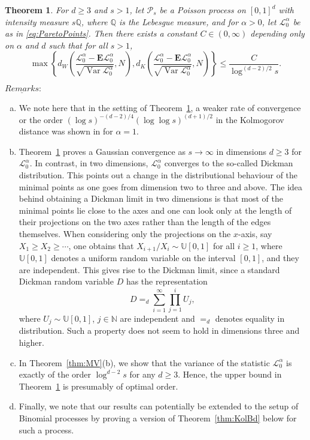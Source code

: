 \documentclass[11pt,reqno]{amsart}
\numberwithin{equation}{section}
\newtheorem{theorem}{Theorem}[section]
\theoremstyle{definition}
\newcommand{\E}{\mathbf{E}}
\newcommand{\sP}{\mathcal{P}}
\newcommand{\N}{\mathbb{N}}
\newcommand{\QQ}{\mathbb{Q}}
\DeclareMathOperator{\Var}{Var}
\begin{document}
\begin{theorem}\label{thm:Pareto}
	For $d \ge 3$ and $s >1$, let $\sP_s$ be a Poisson process on $[0,1]^d$ with intensity measure
	$s\QQ$, where $\QQ$ is the Lebesgue measure, and for $\alpha>0$, let $\mathscr{L}_0^{\alpha}$ be as in \eqref{eq:ParetoPoints}. Then there exists a constant $C \in (0,\infty)$ depending only on $\alpha$ and $d$ such that for all $ s>1$,
	\begin{displaymath}
	\max \left\{d_W\left(\frac{\mathscr{L}_0^{\alpha} - \E \mathscr{L}_0^{\alpha}}{\sqrt{\Var
			\mathscr{L}_0^{\alpha}}},N\right),
	d_K\left(\frac{\mathscr{L}_0^{\alpha} - \E \mathscr{L}_0^{\alpha}}{\sqrt{\Var \mathscr{L}_0^{\alpha}}},N\right)\right\} \le
	\frac{C}{\log^{(d-2)/2} s}.
	\end{displaymath}
\end{theorem}

\vspace{.1cm}

\noindent$\underline{Remarks}:$ \begin{enumerate}[(a)]
	\item We note here that in the setting of Theorem~\ref{thm:Pareto}, a weaker rate of convergence or the order $(\log s)^{-(d-2)/4} (\log \log s)^{(d+1)/2}$ in the Kolmogorov distance was shown in \cite{BLP06} for $\alpha=1$.
	\item Theorem~\ref{thm:Pareto} proves a Gaussian convergence as $s \to \infty$ in dimensions $d \ge 3$ for $\mathscr{L}_0^{\alpha}$. In contrast, in two dimensions, $\mathscr{L}_0^{\alpha}$ converges to the so-called Dickman distribution. This points out a change in the distributional behaviour of the minimal points as one goes from dimension two to three and above. The idea behind obtaining a Dickman limit in two dimensions is that most of the minimal points lie close to the axes and one can look only at the length of their projections on the two axes rather than the length of the edges themselves. When considering only the projections on the $x$-axis, say $X_1 \ge X_2 \ge \cdots$, one obtains that $X_{i+1}/X_i \sim \mathbb{U}[0,1]$ for all $i \ge 1$, where $\mathbb{U}[0,1]$ denotes a uniform random variable on the interval $[0,1]$, and they are independent. This gives rise to the Dickman limit, since a standard Dickman random variable $D$ has the representation
		$$
		D =_d \sum_{i=1}^\infty \prod_{j=1}^{i} U_j,
		$$
		where $U_j \sim \mathbb{U}[0,1]$, $j \in \N$ are independent and $=_d$ denotes equality in distribution. Such a property does not seem to hold in dimensions three and higher.
	\item  In Theorem~\ref{thm:MV}(b), we show that the variance of the statistic $\mathscr{L}_0^{\alpha}$ is exactly of the order $\log^{d-2} s$ for any $d \ge 3$. Hence, the upper bound in Theorem~\ref{thm:Pareto} is presumably of optimal order. 
	\item  Finally, we note that our results can potentially be extended to the setup of Binomial processes by proving a version of Theorem~\ref{thm:KolBd} below for such a  process.
\end{enumerate}
\vspace{.1cm}
\end{document}
